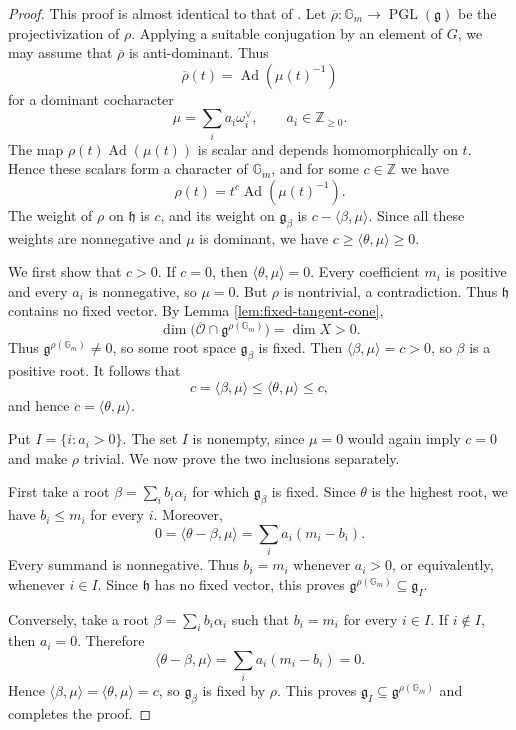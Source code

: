 \documentclass[10pt,a4paper]{amsart}
\DeclareMathOperator{\Ad}{Ad}
\newcommand{\Gm}{\mathbb G_m}
\begin{document}
\begin{proof}
This proof is almost identical to that of
\cite[Lemma 3.3]{Jia}.
Let $\overline\rho:\Gm\to\operatorname{PGL}(\mathfrak g)$ be the
projectivization of $\rho$.
Applying a suitable conjugation by an element of $G$, we may assume that
$\overline\rho$ is anti-dominant. Thus
\[
\overline\rho(t)=\Ad(\mu(t)^{-1})
\]
for a dominant cocharacter
\[
\mu=\sum_i a_i\omega_i^\vee,
\qquad
a_i\in\mathbb Z_{\geq0}.
\]
The map $\rho(t)\Ad(\mu(t))$ is scalar and depends homomorphically on
$t$. Hence these scalars form a character of $\Gm$, and for some
$c\in\mathbb Z$ we have
\[
\rho(t)=t^c\Ad(\mu(t)^{-1}).
\]
The weight of $\rho$ on $\mathfrak h$ is $c$, and its weight on
$\mathfrak g_\beta$ is $c-\langle\beta,\mu\rangle$. Since all these
weights are nonnegative and $\mu$ is dominant, we have
$c\geq\langle\theta,\mu\rangle\geq0$.

We first show that $c>0$. If $c=0$, then
$\langle\theta,\mu\rangle=0$. Every coefficient $m_i$ is positive and
every $a_i$ is nonnegative, so $\mu=0$. But $\rho$ is nontrivial, a
contradiction. Thus $\mathfrak h$ contains no fixed vector.
By Lemma \ref{lem:fixed-tangent-cone},
\[
\dim\bigl(\overline{\mathcal O}\cap
\mathfrak g^{\rho(\Gm)}\bigr)=\dim X>0.
\]
Thus $\mathfrak g^{\rho(\Gm)}\ne0$, so some root space
$\mathfrak g_\beta$ is fixed. Then
$\langle\beta,\mu\rangle=c>0$, so $\beta$ is a positive root.
It follows that
\[
c=\langle\beta,\mu\rangle
\leq\langle\theta,\mu\rangle\leq c,
\]
and hence $c=\langle\theta,\mu\rangle$.

Put $I=\{i:a_i>0\}$. The set $I$ is nonempty, since $\mu=0$ would
again imply $c=0$ and make $\rho$ trivial. We now prove the two
inclusions separately.

First take a root $\beta=\sum_i b_i\alpha_i$ for which
$\mathfrak g_\beta$ is fixed. Since $\theta$ is the highest root, we have
$b_i\leq m_i$ for every $i$. Moreover,
\[
0=\langle\theta-\beta,\mu\rangle
=\sum_i a_i(m_i-b_i).
\]
Every summand is nonnegative. Thus $b_i=m_i$ whenever $a_i>0$, or
equivalently, whenever $i\in I$. Since $\mathfrak h$ has no fixed
vector, this proves
$\mathfrak g^{\rho(\Gm)}\subseteq\mathfrak g_I$.

Conversely, take a root $\beta=\sum_i b_i\alpha_i$ such that
$b_i=m_i$ for every $i\in I$. If $i\notin I$, then $a_i=0$. Therefore
\[
\langle\theta-\beta,\mu\rangle
=\sum_i a_i(m_i-b_i)=0.
\]
Hence $\langle\beta,\mu\rangle=\langle\theta,\mu\rangle=c$, so
$\mathfrak g_\beta$ is fixed by $\rho$. This proves
$\mathfrak g_I\subseteq\mathfrak g^{\rho(\Gm)}$ and completes the proof.
\end{proof}
\end{document}
